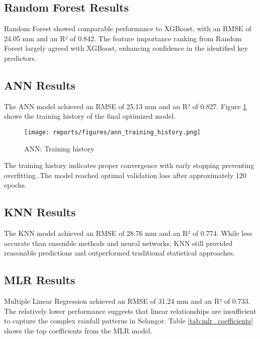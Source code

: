 \documentclass[12pt]{article}
\begin{document}
\subsection{Random Forest Results}
\label{subsec:rf_results}

Random Forest showed comparable performance to XGBoost, with an RMSE of 24.05 mm and an R² of 0.842. The feature importance ranking from Random Forest largely agreed with XGBoost, enhancing confidence in the identified key predictors.

\subsection{ANN Results}
\label{subsec:ann_results}

The ANN model achieved an RMSE of 25.13 mm and an R² of 0.827. Figure \ref{fig:ann_training} shows the training history of the final optimized model.

\begin{figure}[h]
\centering
\texttt{[image: reports/figures/ann\_training\_history.png]}
\caption{ANN: Training history}
\label{fig:ann_training}
\end{figure}

The training history indicates proper convergence with early stopping preventing overfitting. The model reached optimal validation loss after approximately 120 epochs.

\subsection{KNN Results}
\label{subsec:knn_results}

The KNN model achieved an RMSE of 28.76 mm and an R² of 0.774. While less accurate than ensemble methods and neural networks, KNN still provided reasonable predictions and outperformed traditional statistical approaches.

\subsection{MLR Results}
\label{subsec:mlr_results}

Multiple Linear Regression achieved an RMSE of 31.24 mm and an R² of 0.733. The relatively lower performance suggests that linear relationships are insufficient to capture the complex rainfall patterns in Selangor. Table \ref{tab:mlr_coefficients} shows the top coefficients from the MLR model.
\end{document}
